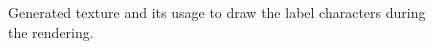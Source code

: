 \begin{figure}[p]
  \begin{adjustwidth}{0mm}{-0.1mm}  
    \hfill
  \end{adjustwidth}
  \caption[Generated texture used to draw the text.]{Generated texture and its usage to draw the label characters during the rendering.}%
  \label{fig:label-texture}
\end{figure}

